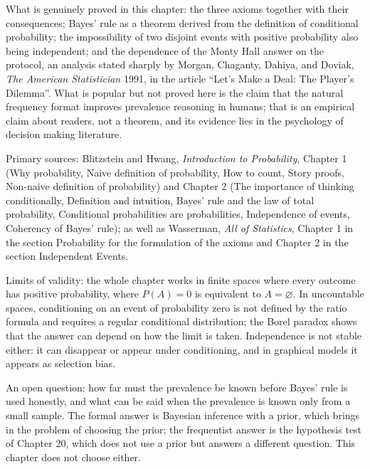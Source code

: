 \begin{untukpeneliti}
What is genuinely proved in this chapter: the three axioms together with their consequences;
Bayes' rule as a theorem derived from the definition of conditional probability; the
impossibility of two disjoint events with positive probability also being independent; and
the dependence of the Monty Hall answer on the protocol, an analysis stated sharply by
Morgan, Chaganty, Dahiya, and Doviak, \emph{The American Statistician} 1991, in the article
``Let's Make a Deal: The Player's Dilemma''. What is popular but not proved here
is the claim that the natural frequency format improves prevalence reasoning in humans;
that is an empirical claim about readers, not a theorem, and its evidence lies in the
psychology of decision making literature.
\end{untukpeneliti}

Primary sources: Blitzstein and Hwang, \emph{Introduction to Probability}, Chapter 1 (Why
probability, Naive definition of probability, How to count, Story proofs, Non-naive
definition of probability) and Chapter 2 (The importance of thinking conditionally,
Definition and intuition, Bayes' rule and the law of total probability, Conditional
probabilities are probabilities, Independence of events, Coherency of Bayes' rule);
as well as Wasserman, \emph{All of Statistics}, Chapter 1 in the section Probability for the
formulation of the axioms and Chapter 2 in the section Independent Events.

Limits of validity: the whole chapter works in finite spaces where every outcome has
positive probability, where $P(A)=0$ is equivalent to $A=\varnothing$. In uncountable
spaces, conditioning on an event of probability zero is not defined by the ratio formula
and requires a regular conditional distribution; the Borel paradox shows that the answer
can depend on how the limit is taken. Independence is not stable either: it can disappear
or appear under conditioning, and in graphical models it appears as selection bias.

An open question: how far must the prevalence be known before Bayes' rule is used
honestly, and what can be said when the prevalence is known only from a small sample. The
formal answer is Bayesian inference with a prior, which brings in the problem of choosing
the prior; the frequentist answer is the hypothesis test of Chapter 20, which does not use
a prior but answers a different question. This chapter does not choose either.

